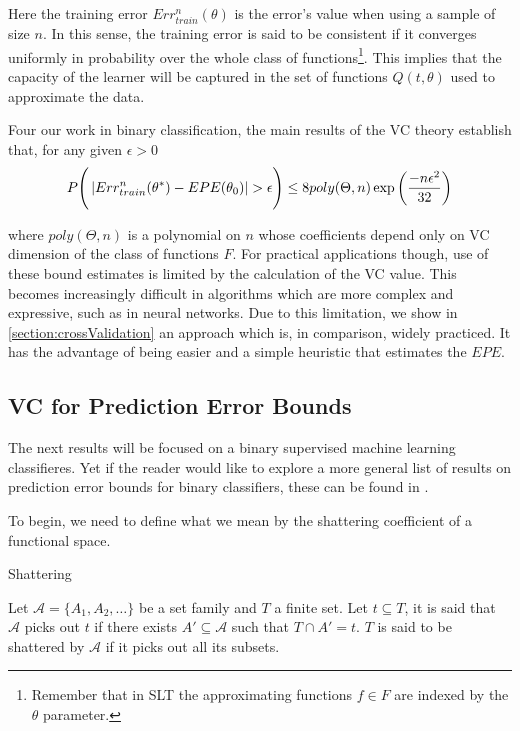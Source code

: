 \begin{appendices}
Here the training error $Err^{n}_{train}(\theta)$ is the error's value when using a sample of size $n$.
In this sense, the training error is said to be consistent if it converges uniformly in probability over the whole class of functions\footnote{Remember that in SLT the approximating functions $f \in F$ are indexed by the $\theta$ parameter.}.
This implies that the capacity of the learner will be captured in the set of functions $Q(t,\theta)$ used to approximate the data.


	Four our work in binary classification, the main results of the VC theory establish that, for any given $\epsilon > 0$
\begin{equation}
P\Bigg(  \left|  Err^n_{train}(\theta^*) - EPE(\theta_0) \right| > \epsilon \Bigg)  \leq 8 poly(\Theta,n) \exp{\large \left( {\frac{-n\epsilon^2}{32}} \right)  }
\end{equation}\label{eq:vapnik-binaryBoundProbability}

where $poly(\Theta,n)$ is a polynomial on $n$ whose coefficients depend only on VC dimension of the class of functions $F$.
For practical applications though, use of these bound estimates is limited by the calculation of the VC value.
This becomes increasingly difficult in algorithms which are more complex and expressive, such as in neural networks.
Due to this limitation, we show in \cref{section:crossValidation} an approach which is, in comparison, widely practiced.
It has the advantage of being easier and a simple heuristic that estimates the $EPE$.

\subsection{VC for Prediction Error Bounds }\label{appx:sec:vcErrroBounds}

The next results will be focused on a binary supervised machine learning classifieres. Yet if the reader would like to explore a more general list of results on prediction error bounds for binary classifiers, these can be found in \textcite{cherkassky-learning2007}.

To begin, we need to define what we mean by the shattering coefficient of a functional space.

\begin{definition}{Shattering}

Let $\mathcal {A}= \{A_1,A_{2},\dots \}$ be a set family and $T$ a finite set.
Let $t \subseteq T$, it is said that $\mathcal {A}$ picks out $t$ if there exists $A' \subseteq \mathcal {A} $ such that $ T \cap A' = t$.
$T$ is said to be shattered by $\mathcal {A}$ if it picks out all its subsets.


\end{definition}
\end{appendices}
